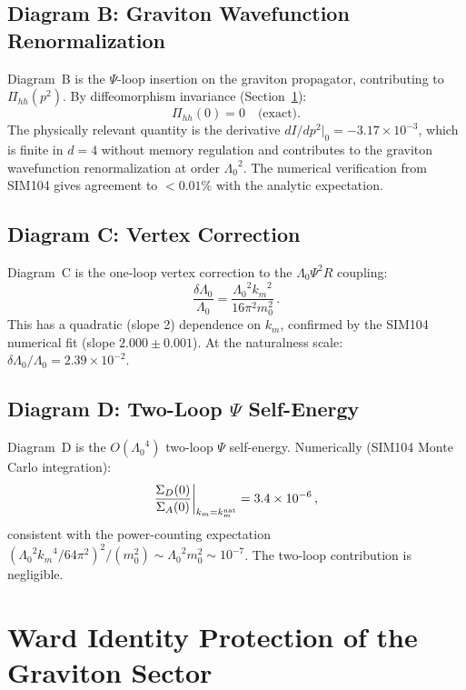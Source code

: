 \documentclass[12pt,a4paper]{article}
\newcommand{\Lz}{{\Lambda_0}}
\newcommand{\km}{{k_m}}
\newcommand{\knat}{{k_m^{\rm nat}}}
\begin{document}
\subsection{Diagram B: Graviton Wavefunction Renormalization}

Diagram~B is the $\Psi$-loop insertion on the graviton propagator,
contributing to $\Pi_{hh}(p^2)$. By diffeomorphism invariance
(Section~\ref{sec:ward}):
\begin{equation}
  \Pi_{hh}(0) = 0 \quad \text{(exact)}.
\end{equation}
The physically relevant quantity is the derivative $dI/dp^2|_0 =
-3.17\times10^{-3}$, which is finite in $d=4$ without memory regulation
and contributes to the graviton wavefunction renormalization at order $\Lz^2$.
The numerical verification from SIM104 gives agreement to $<0.01\%$ with the
analytic expectation.

\subsection{Diagram C: Vertex Correction}

Diagram~C is the one-loop vertex correction to the $\Lz\Psi^2 R$ coupling:
\begin{equation}
  \frac{\delta\Lz}{\Lz}
  = \frac{\Lz^2 \km^2}{16\pi^2 m_0^2}\,.
  \label{eq:vertex}
\end{equation}
This has a quadratic (slope 2) dependence on $\km$, confirmed by the SIM104
numerical fit (slope $2.000 \pm 0.001$). At the naturalness scale:
$\delta\Lz/\Lz = 2.39\times10^{-2}$.

\subsection{Diagram D: Two-Loop \texorpdfstring{$\Psi$}{Psi} Self-Energy}

Diagram~D is the $O(\Lz^4)$ two-loop $\Psi$ self-energy. Numerically
(SIM104 Monte Carlo integration):
\begin{equation}
  \frac{\Sigma_D(0)}{\Sigma_A(0)}\bigg|_{\km = \knat}
  = 3.4\times10^{-6}\,,
\end{equation}
consistent with the power-counting expectation $(\Lz^2 \km^4/64\pi^2)^2 /
(m_0^2) \sim \Lz^2 m_0^2 \sim 10^{-7}$. The two-loop contribution is
negligible.

\section{Ward Identity Protection of the Graviton Sector}
\label{sec:ward}
\end{document}
